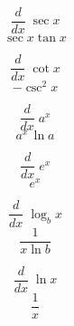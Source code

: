 \documentclass[avery5371,grid]{flashcards}
\begin{document}
\begin{flashcard}{\large \vspace*{\fill} \[ \dfrac{d}{dx}\; \sec x  \] \vspace*{\fill}   }{\large \vspace*{\fill} \[ \sec x \tan x  \] \vspace*{\fill}   }\end{flashcard}

\begin{flashcard}{\large \vspace*{\fill} \[ \dfrac{d}{dx}\; \cot x  \] \vspace*{\fill}   }{\large \vspace*{\fill} \[ -\csc^2 x   \] \vspace*{\fill}   }\end{flashcard}

\begin{flashcard}{\large \vspace*{\fill} \[ \dfrac{d}{dx}\; a^x  \] \vspace*{\fill}   }{\large \vspace*{\fill} \[ a^x \, \ln a   \] \vspace*{\fill}   }\end{flashcard}

\begin{flashcard}{\large \vspace*{\fill} \[ \dfrac{d}{dx}\;  e^x  \] \vspace*{\fill}   }{\large \vspace*{\fill} \[ e^x   \] \vspace*{\fill}   }\end{flashcard}




\begin{flashcard}{\large \vspace*{\fill} \[ \dfrac{d}{dx}\; \log_b x  \] \vspace*{\fill}   }{\large \vspace*{\fill} \[ \dfrac{1}{x \ln b}  \] \vspace*{\fill}   }\end{flashcard}

\begin{flashcard}{\large \vspace*{\fill} \[ \dfrac{d}{dx}\; \ln x  \] \vspace*{\fill}   }{\large \vspace*{\fill} \[ \dfrac{1}{x}   \] \vspace*{\fill}   }\end{flashcard}
\end{document}
